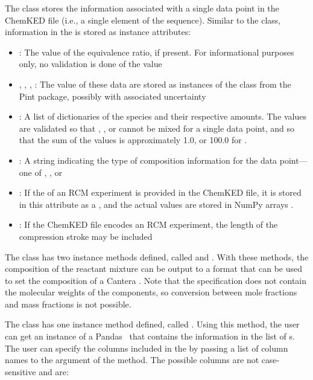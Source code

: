 \documentclass[12pt]{ussci}
\newcommand\ck{ChemKED}
\begin{document}
The  class stores the information associated with a single data
point in the \ck{} file (i.e., a single element of the 
sequence). Similar to the  class, information in the
 is stored as instance attributes:
%
\begin{itemize}
    \item {}: The value of the equivalence ratio, if
    present. For informational purposes only, no validation is done of the value
    \item {}, , ,
    : The value of these data are stored as instances of
    the  class from the Pint \autocite{Grecco2016} package,
    possibly with associated uncertainty
    \item {}: A list of dictionaries of the species and their
    respective amounts. The values are validated so that ,
    , or  cannot be mixed for a single
    data point, and so that the sum of the values is approximately 1.0, or
    100.0 for .
    \item {}: A string indicating the type of composition
    information for the data point---one of ,
    , or 
    \item {}: If the  of an RCM
    experiment is provided in the \ck{} file, it is stored in this attribute as
    a , and the actual values are stored in NumPy arrays
    \autocite{vanderWalt:2011np}.
    \item {}: If the \ck{} file encodes an RCM experiment,
    the length of the compression stroke may be included
\end{itemize}

The  class has two instance methods defined, called
 and .
With these methods, the composition of the reactant mixture can be output to a
format that can be used to set the composition of a Cantera .
Note that the  specification does not contain the molecular
weights of the components, so conversion between mole fractions and mass
fractions is not possible.

The  class has one instance method defined, called
. Using this method, the user can get an instance of a
Pandas~\autocite{pandas}  that contains the information in the
list of s. The user can specify the columns included in the
 by passing a list of column names to the
 argument of the  method. The
possible columns are not case-sensitive and are:
\end{document}

